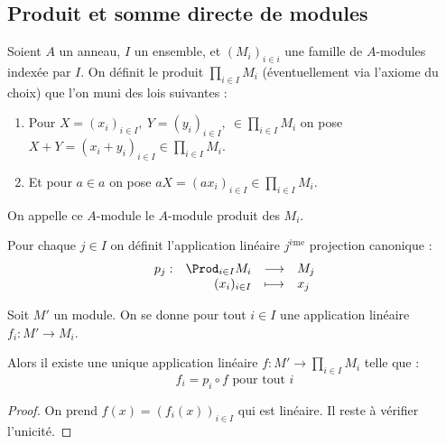 \subsection{Produit et somme directe de modules}
\vspace{0.5em}

\begin{defi}
 
 Soient $A$ un anneau, $I$ un ensemble, et $(M_i)_{i\in i}$ une famille de
$A$-modules indexée par $I$. On définit le produit $\prod_{i\in I}M_i$
(éventuellement via l'axiome du choix) que l'on muni des lois suivantes :
\begin{enumerate}
 \item Pour $X = (x_i)_{i\in I},\ Y = (y_i)_{i\in I},\ \in \prod_{i\in I}M_i$
on pose $X+Y = (x_i + y_i)_{i\in I} \in \prod_{i\in I}M_i$.
\item Et pour $a\in a$ on pose $aX = (ax_i)_{i\in I} \in \prod_{i\in I}M_i$.
\end{enumerate}

On appelle ce $A$-module le $A$-module produit des $M_i$.
\end{defi}

\begin{defi}

Pour chaque $j\in I$ on définit l'application linéaire $j^{\text{ème}}$
projection canonique :
\begin{displaymath} \begin{array}{rrcl}
p_j : &\Prod_{i\in I}M_i &\longrightarrow& M_j \\
      &(x_i)_{i\in I} & \longmapsto & x_j
\end{array} \end{displaymath}
\end{defi}


\begin{prop}
 
 Soit $M'$ un module. On se donne pour tout $i\in I$ une application linéaire
$f_i : M' \rightarrow M_i$.

Alors il existe une unique application linéaire $f : M' \rightarrow \prod_{i\in
I}M_i$ telle que :
\begin{displaymath}
 f_i = p_i \circ f \text{ pour tout }i
\end{displaymath}
\end{prop}

\begin{proof} 
 On prend $f(x) = (f_i(x))_{i\in I}$ qui est linéaire. Il reste à
vérifier l'unicité.
\end{proof}

